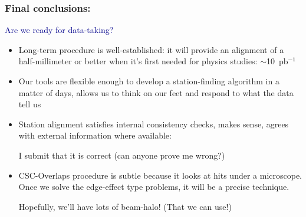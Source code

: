 \documentclass[compress]{beamer}
\begin{document}
\begin{frame}
\frametitle{Final conclusions:}

\vspace{-0.35 cm}
\hspace{-0.83 cm} \textcolor{darkblue}{\Large Are we ready for data-taking?}

\vfill
\begin{itemize}\setlength{\itemsep}{0.25 cm}
\item Long-term procedure is well-established: it will provide
  an alignment of a half-millimeter or better when it's first needed
  for physics studies: $\sim$10~pb$^{-1}$

\item Our tools are flexible enough to develop a station-finding
  algorithm in a matter of days, allows us to think on our feet and
  respond to what the data tell us

\item Station alignment satisfies internal consistency checks, makes
  sense, agrees with external information where available:

I submit that it is correct (can anyone prove me wrong?)

\item CSC-Overlaps procedure is subtle because it looks at hits
  under a microscope.  Once we solve the edge-effect type problems, it
  will be a precise technique.

\vfill Hopefully, we'll have lots of beam-halo! (That we can use!)

\end{itemize}
\label{numpages}
\end{frame}
\end{document}
